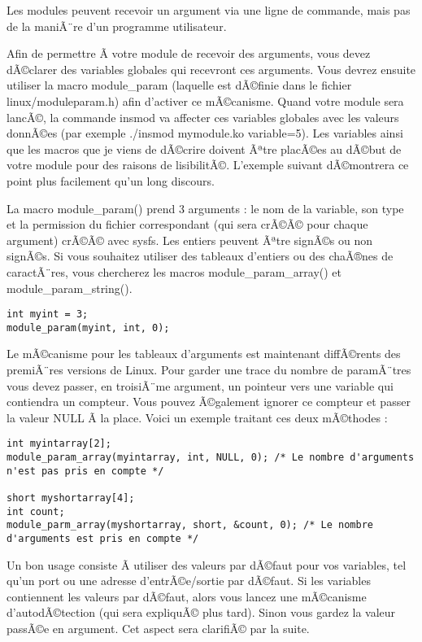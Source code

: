\documentclass[11pt]{article}
\begin{document}
Les modules peuvent recevoir un argument via une ligne de commande, mais pas de la maniÃ¨re d'un programme utilisateur.

Afin de permettre Ã  votre module de recevoir des arguments, vous devez dÃ©clarer des variables globales qui recevront ces arguments. Vous devrez ensuite utiliser la macro module\_param (laquelle est dÃ©finie dans le fichier linux/moduleparam.h) afin d'activer ce mÃ©canisme. Quand votre module sera lancÃ©, la commande insmod va affecter ces variables globales avec les valeurs donnÃ©es (par exemple ./insmod mymodule.ko variable=5). Les variables ainsi que les macros que je viens de dÃ©crire doivent Ãªtre placÃ©es au dÃ©but de votre module pour des raisons de lisibilitÃ©. L'exemple suivant dÃ©montrera ce point plus facilement qu'un long discours.

La macro module\_param() prend 3 arguments : le nom de la variable, son type et la permission du fichier correspondant (qui sera crÃ©Ã© pour chaque argument) crÃ©Ã© avec sysfs. Les entiers peuvent Ãªtre signÃ©s ou non signÃ©s. Si vous souhaitez utiliser des tableaux d'entiers ou des chaÃ®nes de caractÃ¨res, vous chercherez les macros module\_param\_array() et module\_param\_string().

\begin{verbatim}
int myint = 3;
module_param(myint, int, 0);
\end{verbatim}

Le mÃ©canisme pour les tableaux d'arguments est maintenant diffÃ©rents des premiÃ¨res versions de Linux. Pour garder une trace du nombre de paramÃ¨tres vous devez passer, en troisiÃ¨me argument, un pointeur vers une variable qui contiendra un compteur. Vous pouvez Ã©galement ignorer ce compteur et passer la valeur NULL Ã  la place. Voici un exemple traitant ces deux mÃ©thodes :

\begin{verbatim}
int myintarray[2];
module_param_array(myintarray, int, NULL, 0); /* Le nombre d'arguments n'est pas pris en compte */

short myshortarray[4];
int count;
module_parm_array(myshortarray, short, &count, 0); /* Le nombre d'arguments est pris en compte */
\end{verbatim}

Un bon usage consiste Ã  utiliser des valeurs par dÃ©faut pour vos variables, tel qu'un port ou une adresse d'entrÃ©e/sortie par dÃ©faut. Si les variables contiennent les valeurs par dÃ©faut, alors vous lancez une mÃ©canisme d'autodÃ©tection (qui sera expliquÃ© plus tard). Sinon vous gardez la valeur passÃ©e en argument. Cet aspect sera clarifiÃ© par la suite.
\end{document}
